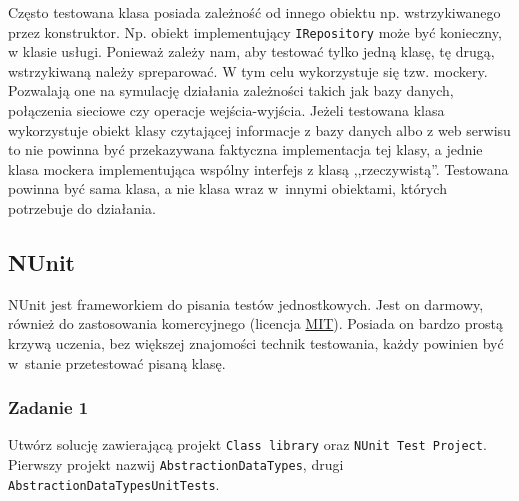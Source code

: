 
Często testowana klasa posiada zależność od innego obiektu np. wstrzykiwanego przez konstruktor. Np. obiekt implementujący \texttt{IRepository} może być konieczny, w klasie usługi. Ponieważ zależy nam, aby testować tylko jedną klasę, tę drugą, wstrzykiwaną należy spreparować. W tym celu wykorzystuje się tzw. mockery. Pozwalają one na symulację działania zależności takich jak bazy danych, połączenia sieciowe czy operacje wejścia-wyjścia. Jeżeli testowana klasa wykorzystuje obiekt klasy czytającej informacje z bazy danych albo z web serwisu to nie powinna być przekazywana faktyczna implementacja tej klasy, a jednie klasa mockera implementująca wspólny interfejs z klasą ,,rzeczywistą''. Testowana powinna być sama klasa, a nie klasa wraz w~innymi obiektami, których potrzebuje do działania. 


\subsection{NUnit}


NUnit jest frameworkiem do pisania testów jednostkowych. Jest on darmowy, również do zastosowania komercyjnego (licencja \href{https://mit-license.org/}{MIT}). Posiada on bardzo prostą krzywą uczenia, bez większej znajomości technik testowania, każdy powinien być w~stanie przetestować pisaną klasę.

\subsubsection{Zadanie 1}\label{lab5/sec/exercise_1}
Utwórz solucję zawierającą projekt \texttt{Class library} oraz \texttt{NUnit Test Project}. Pierwszy projekt nazwij \texttt{AbstractionDataTypes}, drugi \texttt{AbstractionDataTypesUnitTests}. 

